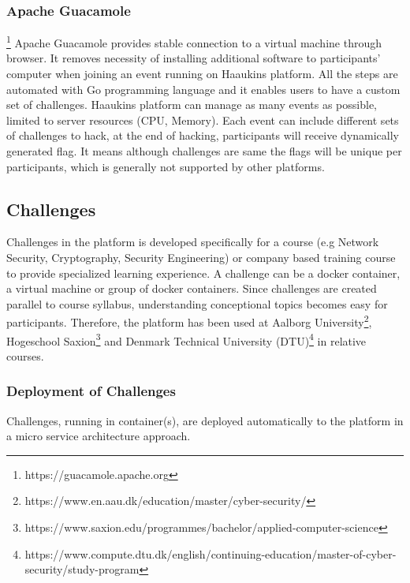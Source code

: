 \subsubsection{Apache Guacamole}\footnote{https://guacamole.apache.org}
Apache Guacamole provides stable connection to a virtual machine through browser. It removes necessity of installing additional software to participants' computer when joining an event running on Haaukins platform. 
All the steps are automated with Go programming language and it enables users to have a custom set of challenges. Haaukins platform can manage as many events as possible, limited to server resources (CPU, Memory). Each event can include different sets of challenges to hack, at the end of hacking, participants will receive dynamically generated flag. It means although challenges are same the flags will be unique per participants, which is generally not supported by other platforms. 

\subsection{Challenges}

Challenges in the platform is developed specifically for a course (e.g Network Security, Cryptography, Security Engineering) or company based training course to provide specialized learning experience. A challenge can be a docker container, a virtual machine or group of docker containers. Since challenges are created parallel to course syllabus, understanding conceptional topics becomes easy for participants. Therefore, the platform has been used at Aalborg University\footnote{https://www.en.aau.dk/education/master/cyber-security/},  Hogeschool Saxion\footnote{https://www.saxion.edu/programmes/bachelor/applied-computer-science} and Denmark Technical University (DTU)\footnote{https://www.compute.dtu.dk/english/continuing-education/master-of-cyber-security/study-program} in relative courses. 

\subsubsection{Deployment of Challenges}

Challenges, running in container(s), are deployed automatically to the platform in a micro service architecture approach. 

